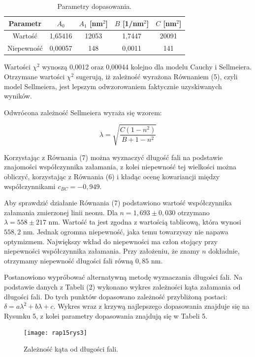 \documentclass[10pt,a4paper]{article}
\begin{document}
\begin{table}[h!]
\centering
\caption{Parametry dopasowania.}
\begin{tabular}{|c|c|c|c|c|}
\hline
Parametr   & $A_{0}$ & $A_{1}$ [nm$^2$] & $B$ [1/nm$^2$] & $C$ [nm$^2$] \\ \hline
Wartość    & 1,65416 & 12053            & 1,7447         & 20091        \\ \hline
Niepewność & 0,00057 & 148              & 0,0011         & 141          \\ \hline
\end{tabular}
\end{table}

Wartości $\chi^2$ wynoszą 0,0012 oraz 0,00044 kolejno dla modelu Cauchy i Sellmeiera.
Otrzymane wartości $\chi^2$ sugerują, iż zależność wyrażona Równaniem (5), czyli model Sellmeiera, jest lepszym odwzorowaniem faktycznie uzyskiwanych wyników.

Odwrócona zależność Sellmeiera wyraża się wzorem:

\begin{equation}
\lambda=\sqrt{\dfrac{C\left(1-n^2\right)}{B+1-n^2}}
\end{equation}

Korzystając z Równania (7) można wyznaczyć długość fali na podstawie znajomości współczynnika załamania, z kolei niepewność tej wielkości można obliczyć, korzystając z Równania (6) i kładąc ocenę kowariancji między współczynnikami $c_{BC}=-0,949$.

Aby sprawdzić działanie Równania (7) podstawiono wartość współczynnika załamania zmierzonej linii neonu. Dla $n=1,693\pm0,030$ otrzymano $\lambda=558\pm217$ nm. Wartość ta jest zgodna z wartością tablicową, która wynosi $558,2$ nm. Jednak ogromna niepewność, jaka temu towarzyszy nie napawa optymizmem. Największy wkład do niepewności ma człon stojący przy niepewności współczynnika załamania. Przy założeniu, że znamy $n$ dokładnie, otrzymamy niepewność długości fali równą $0,85$ nm.

Postanowiono wypróbować alternatywną metodę wyznaczania długości fali. Na podstawie danych z Tabeli (2) wykonano wykres zależności kąta załamania od długości fali. Do tych punktów dopasowano zależność przybliżoną postaci: $\delta=a\lambda^2+b\lambda+c$. Wykres wraz z krzywą najlepszego dopasowania znajduje się na Rysunku 5, z kolei parametry dopasowania znajdują się w Tabeli 5.

\begin{figure}[h!]
\texttt{[image: rap15rys3]} 
\centering
\caption{Zależność kąta od długości fali.}
\end{figure}
\end{document}
